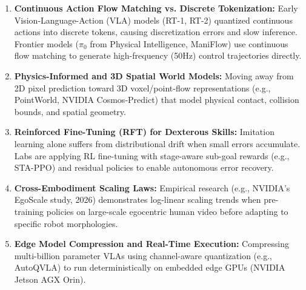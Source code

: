 \documentclass[11pt,a4paper]{article}
\begin{document}
\begin{enumerate}
    \item \textbf{Continuous Action Flow Matching vs. Discrete Tokenization:}
    Early Vision-Language-Action (VLA) models (RT-1, RT-2) quantized continuous actions into discrete tokens, causing discretization errors and slow inference. Frontier models ($\pi_0$ from Physical Intelligence, ManiFlow) use continuous flow matching to generate high-frequency (50Hz) control trajectories directly.
    \item \textbf{Physics-Informed and 3D Spatial World Models:}
    Moving away from 2D pixel prediction toward 3D voxel/point-flow representations (e.g., PointWorld, NVIDIA Cosmos-Predict) that model physical contact, collision bounds, and spatial geometry.
    \item \textbf{Reinforced Fine-Tuning (RFT) for Dexterous Skills:}
    Imitation learning alone suffers from distributional drift when small errors accumulate. Labs are applying RL fine-tuning with stage-aware sub-goal rewards (e.g., STA-PPO) and residual policies to enable autonomous error recovery.
    \item \textbf{Cross-Embodiment Scaling Laws:}
    Empirical research (e.g., NVIDIA's EgoScale study, 2026) demonstrates log-linear scaling trends when pre-training policies on large-scale egocentric human video before adapting to specific robot morphologies.
    \item \textbf{Edge Model Compression and Real-Time Execution:}
    Compressing multi-billion parameter VLAs using channel-aware quantization (e.g., AutoQVLA) to run deterministically on embedded edge GPUs (NVIDIA Jetson AGX Orin).
\end{enumerate}
\end{document}
